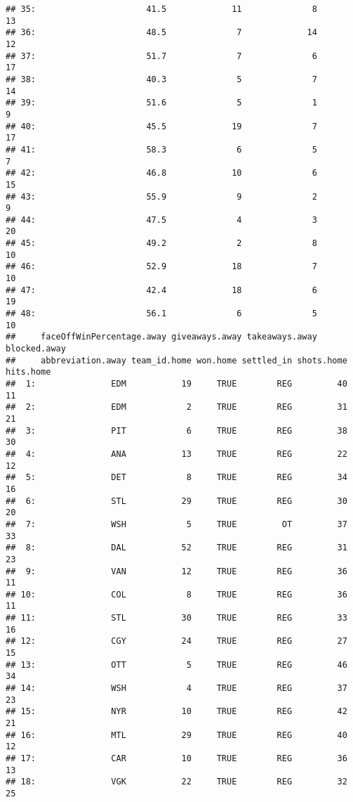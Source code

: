 \documentclass[
]{article}
\begin{document}
\begin{verbatim}
## 35:                      41.5             11              8           13
## 36:                      48.5              7             14           12
## 37:                      51.7              7              6           17
## 38:                      40.3              5              7           14
## 39:                      51.6              5              1            9
## 40:                      45.5             19              7           17
## 41:                      58.3              6              5            7
## 42:                      46.8             10              6           15
## 43:                      55.9              9              2            9
## 44:                      47.5              4              3           20
## 45:                      49.2              2              8           10
## 46:                      52.9             18              7           10
## 47:                      42.4             18              6           19
## 48:                      56.1              6              5           10
##     faceOffWinPercentage.away giveaways.away takeaways.away blocked.away
##     abbreviation.away team_id.home won.home settled_in shots.home hits.home
##  1:               EDM           19     TRUE        REG         40        11
##  2:               EDM            2     TRUE        REG         31        21
##  3:               PIT            6     TRUE        REG         38        30
##  4:               ANA           13     TRUE        REG         22        12
##  5:               DET            8     TRUE        REG         34        16
##  6:               STL           29     TRUE        REG         30        20
##  7:               WSH            5     TRUE         OT         37        33
##  8:               DAL           52     TRUE        REG         31        23
##  9:               VAN           12     TRUE        REG         36        11
## 10:               COL            8     TRUE        REG         36        11
## 11:               STL           30     TRUE        REG         33        16
## 12:               CGY           24     TRUE        REG         27        15
## 13:               OTT            5     TRUE        REG         46        34
## 14:               WSH            4     TRUE        REG         37        23
## 15:               NYR           10     TRUE        REG         42        21
## 16:               MTL           29     TRUE        REG         40        12
## 17:               CAR           10     TRUE        REG         36        13
## 18:               VGK           22     TRUE        REG         32        25

\end{verbatim}
\end{document}

